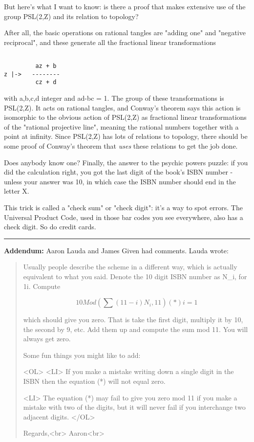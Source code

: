 But here's what I want to know: is there a proof that makes
extensive use of the group PSL(2,Z) and its relation to topology?

After all, the basic operations on rational tangles are "adding
one" and "negative reciprocal", and these generate all the 
fractional linear transformations


\begin{verbatim}

         az + b
z |->   --------
         cz + d
\end{verbatim}
    
with a,b,c,d integer and ad-bc = 1.  The group of these transformations
is PSL(2,Z).  It acts on rational tangles, and Conway's theorem says
this action is isomorphic to the obvious action of PSL(2,Z) as fractional
linear transformations of the "rational projective line", 
meaning the rational 
numbers together with a point at infinity.  Since PSL(2,Z) has lots of 
relations to topology, there should be some proof of Conway's theorem
that \emph{uses} these relations to get the job done.

Does anybody know one?
Finally, the answer to the psychic powers puzzle: if you did the 
calculation right, you got the last digit of the book's ISBN number - 
unless your answer was 10, in which case the ISBN number should end 
in the letter X.

This trick is called a "check sum" or "check digit": 
it's a way to spot 
errors.  The Universal Product Code, used in those bar codes you see
everywhere, also has a check digit.  So do credit cards.  

\par\noindent\rule{\textwidth}{0.4pt}
\textbf{Addendum:}  
Aaron Lauda and James Given had comments.  Lauda wrote:

\begin{quote}
Usually people describe the scheme in a different way, which is
actually equivalent to what you said.  Denote the 10 digit ISBN number 
as N_{i}, for 1\le i. Compute


$$

       10
 Mod(  \sum  (11-i)N_{i} , 11)              (*)
      i=1
$$
    
which should give you zero.  That is take the first digit, multiply it by 
10, the second by 9, etc.  Add them up and compute the sum mod 11.  You 
will always get zero.

Some fun things you might like to add:

<OL>
<LI>
If you make a mistake writing down a single digit in the ISBN then the 
equation (*) will not equal zero.  

<LI>
 The equation (*) may fail to give you zero mod 11 if you make a mistake 
  with two of the digits, but it will never fail if you interchange two 
  adjacent digits.
</OL>

Regards,<br>
Aaron<br>
\end{quote}

